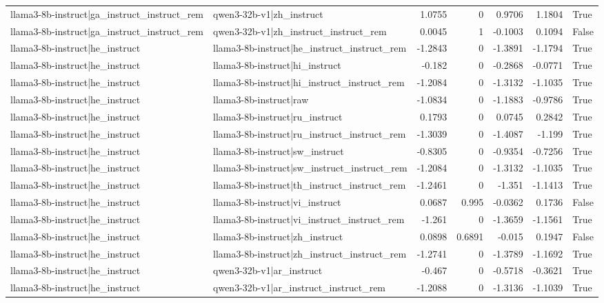 \begin{table}
\begin{tabular}{l l r r r r l}
llama3-8b-instruct|ga_instruct_instruct_rem & qwen3-32b-v1|zh_instruct & 1.0755 & 0 & 0.9706 & 1.1804 & True \\
llama3-8b-instruct|ga_instruct_instruct_rem & qwen3-32b-v1|zh_instruct_instruct_rem & 0.0045 & 1 & -0.1003 & 0.1094 & False \\
llama3-8b-instruct|he_instruct & llama3-8b-instruct|he_instruct_instruct_rem & -1.2843 & 0 & -1.3891 & -1.1794 & True \\
llama3-8b-instruct|he_instruct & llama3-8b-instruct|hi_instruct & -0.182 & 0 & -0.2868 & -0.0771 & True \\
llama3-8b-instruct|he_instruct & llama3-8b-instruct|hi_instruct_instruct_rem & -1.2084 & 0 & -1.3132 & -1.1035 & True \\
llama3-8b-instruct|he_instruct & llama3-8b-instruct|raw & -1.0834 & 0 & -1.1883 & -0.9786 & True \\
llama3-8b-instruct|he_instruct & llama3-8b-instruct|ru_instruct & 0.1793 & 0 & 0.0745 & 0.2842 & True \\
llama3-8b-instruct|he_instruct & llama3-8b-instruct|ru_instruct_instruct_rem & -1.3039 & 0 & -1.4087 & -1.199 & True \\
llama3-8b-instruct|he_instruct & llama3-8b-instruct|sw_instruct & -0.8305 & 0 & -0.9354 & -0.7256 & True \\
llama3-8b-instruct|he_instruct & llama3-8b-instruct|sw_instruct_instruct_rem & -1.2084 & 0 & -1.3132 & -1.1035 & True \\
llama3-8b-instruct|he_instruct & llama3-8b-instruct|th_instruct_instruct_rem & -1.2461 & 0 & -1.351 & -1.1413 & True \\
llama3-8b-instruct|he_instruct & llama3-8b-instruct|vi_instruct & 0.0687 & 0.995 & -0.0362 & 0.1736 & False \\
llama3-8b-instruct|he_instruct & llama3-8b-instruct|vi_instruct_instruct_rem & -1.261 & 0 & -1.3659 & -1.1561 & True \\
llama3-8b-instruct|he_instruct & llama3-8b-instruct|zh_instruct & 0.0898 & 0.6891 & -0.015 & 0.1947 & False \\
llama3-8b-instruct|he_instruct & llama3-8b-instruct|zh_instruct_instruct_rem & -1.2741 & 0 & -1.3789 & -1.1692 & True \\
llama3-8b-instruct|he_instruct & qwen3-32b-v1|ar_instruct & -0.467 & 0 & -0.5718 & -0.3621 & True \\
llama3-8b-instruct|he_instruct & qwen3-32b-v1|ar_instruct_instruct_rem & -1.2088 & 0 & -1.3136 & -1.1039 & True \\

\end{tabular}
\end{table}
